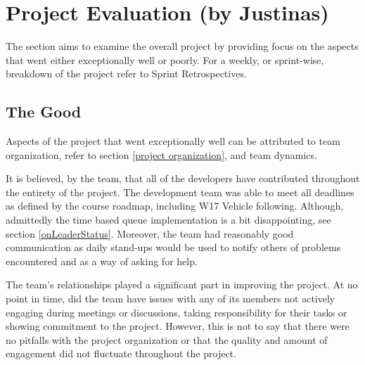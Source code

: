 \documentclass[12pt]{article}
\begin{document}
\section{Project Evaluation (by Justinas)}\label{project evaluation}
The section aims to examine the overall project by providing focus on the aspects that went either exceptionally well or poorly. For a weekly, or sprint-wise, breakdown of the project refer to Sprint Retrospectives\cite{sprint retrospectives}.

\subsection{The Good}
Aspects of the project that went exceptionally well can be attributed to team organization, refer to section \ref{project organization}, and team dynamics. \par
It is believed, by the team, that all of the developers have contributed throughout the entirety of the project. The development team was able to meet all deadlines as defined by the course roadmap, including W17 Vehicle following. Although, admittedly the time based queue implementation is a bit disappointing, see section \ref{onLeaderStatus}. Moreover, the team had reasonably good communication as daily stand-ups would be used to notify others of problems encountered and as a way of asking for help. \par
The team's relationships played a significant part in improving the project. At no point in time, did the team have issues with any of its members not actively engaging during meetings or discussions, taking responsibility for their tasks or showing commitment to the project. However, this is not to say that there were no pitfalls with the project organization or that the quality and amount of engagement did not fluctuate throughout the project. \par
\end{document}
